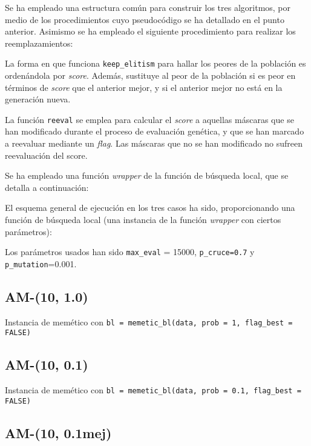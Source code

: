 \documentclass[a4paper,11pt]{article}
\begin{document}
Se ha empleado una estructura común para construir los tres algoritmos, por medio de los procedimientos cuyo pseudocódigo se
ha detallado en el punto anterior. Asimismo se ha empleado el siguiente procedimiento para realizar los reemplazamientos:

\small{\texttt{}}
\normalsize

La forma en que funciona \texttt{keep\_elitism} para hallar los peores de la población es ordenándola por \textit{score}.
Además, sustituye al peor de la población si es peor en términos de \textit{score} que el anterior mejor, y si el anterior
mejor no está en la generación nueva.

La función \texttt{reeval} se emplea para calcular el \textit{score} a aquellas máscaras que se han modificado durante
el proceso de evaluación genética, y que se han marcado a reevaluar mediante un \textit{flag}. Las máscaras que no se han
modificado no sufreen reevaluación del score.


Se ha empleado una función \textit{wrapper} de la función de búsqueda local, que se detalla a continuación:

\small{\texttt{}}
\normalsize


El esquema general de ejecución en los tres casos ha sido, proporcionando una función de búsqueda local (una instancia de la
función \textit{wrapper} con ciertos parámetros):

\small{\texttt{}}
\normalsize

Los parámetros usados han sido \texttt{max\_eval} = 15000, \texttt{p\_cruce=0.7} y \texttt{p\_mutation}=0.001.

\subsection{AM-(10, 1.0)}

Instancia de memético con \texttt{bl = memetic\_bl(data, prob = 1, flag\_best = FALSE)}

\subsection{AM-(10, 0.1)}

Instancia de memético con \texttt{bl = memetic\_bl(data, prob = 0.1, flag\_best = FALSE)}

\subsection{AM-(10, 0.1mej)}
\end{document}
